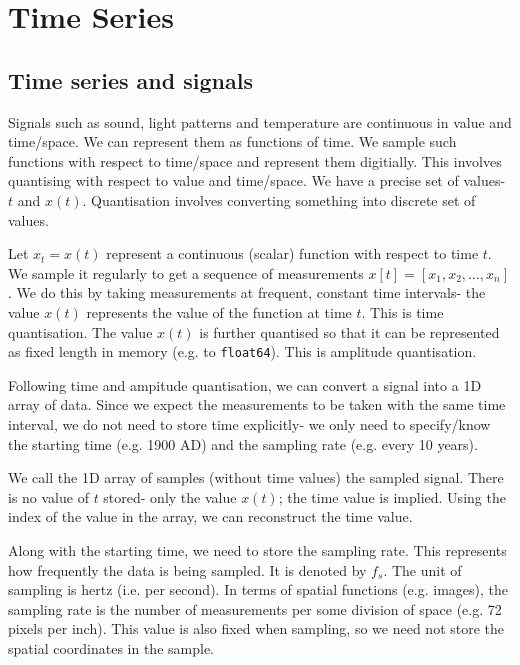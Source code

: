 \documentclass[a4paper, openany]{memoir}
\begin{document}
\chapter{Time Series}
\section{Time series and signals}
Signals such as sound, light patterns and temperature are continuous in value and time/space. We can represent them as functions of time. We sample such functions with respect to time/space and represent them digitially. This involves quantising with respect to value and time/space. We have a precise set of values- $t$ and $x(t)$. Quantisation involves converting something into discrete set of values.

Let $x_t = x(t)$ represent a continuous (scalar) function with respect to time $t$. We sample it regularly to get a sequence of measurements $x[t] = [x_1, x_2, \dots, x_n]$. We do this by taking measurements at frequent, constant time intervals- the value $x(t)$ represents the value of the function at time $t$. This is time quantisation. The value $x(t)$ is further quantised so that it can be represented as fixed length in memory (e.g. to \texttt{float64}). This is amplitude quantisation. 

Following time and ampitude quantisation, we can convert a signal into a 1D array of data. Since we expect the measurements to be taken with the same time interval, we do not need to store time explicitly- we only need to specify/know the starting time (e.g. 1900 AD) and the sampling rate (e.g. every 10 years).

We call the 1D array of samples (without time values) the sampled signal. There is no value of $t$ stored- only the value $x(t)$; the time value is implied. Using the index of the value in the array, we can reconstruct the time value.

Along with the starting time, we need to store the sampling rate. This represents how frequently the data is being sampled. It is denoted by $f_s$. The unit of sampling is hertz (i.e. per second). In terms of spatial functions (e.g. images), the sampling rate is the number of measurements per some division of space (e.g. 72 pixels per inch). This value is also fixed when sampling, so we need not store the spatial coordinates in the sample.
\end{document}

